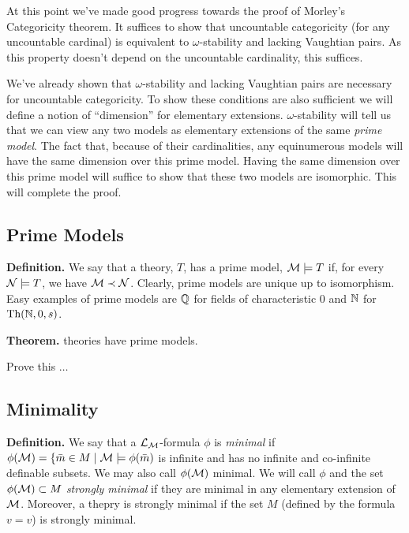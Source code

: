 At this point we've made good progress towards the proof of Morley's Categoricity theorem.
It suffices to show that uncountable categoricity (for any uncountable cardinal) is equivalent to \(\omega\)-stability and lacking Vaughtian pairs.
As this property doesn't depend on the uncountable cardinality, this suffices. 

We've already shown that \(\omega\)-stability and lacking Vaughtian pairs are necessary for uncountable categoricity.
To show these conditions are also sufficient we will define a notion of ``dimension'' for elementary extensions.
\(\omega\)-stability will tell us that we can view any two models as elementary extensions of the same \textit{prime model}.
The fact that, because of their cardinalities, any equinumerous models will have the same dimension over this prime model.
Having the same dimension over this prime model will suffice to show that these two models are isomorphic.
This will complete the proof. 

\subsection{Prime Models}

\textbf{Definition.} We say that a theory, \(T\),  has a prime model, \(\mathcal{M} \models T\) if, for every \(\mathcal{N} \models T\), we have \(\mathcal{M} \prec \mathcal{N}\). 
Clearly, prime models are unique up to isomorphism. Easy examples of prime models are \(\mathbb{Q}\) for fields of characteristic 0 and \(\mathbb{N}\) for \(\text{Th}(\mathbb{N}, 0, s)\). %

\textbf{Theorem.} \omst theories have prime models.
 
{\color{red}Prove this \(\ldots\)}

\subsection{Minimality}

\textbf{Definition.} We say that a \(\mathcal{L}_{\mathcal{M}}\)-formula \(\phi\) is \textit{minimal} if \(\phi(\mathcal{M}) = \{\bar{m} \in M \mid \mathcal{M} \models \phi(\bar{m})\) is infinite and has no infinite and co-infinite definable subsets. 
We may also call \(\phi(\mathcal{M})\) minimal. 
We will call \(\phi\) and the set \(\phi(\mathcal{M}) \subset M\) %
\textit{strongly minimal} if they are minimal in any elementary extension of \(\mathcal{M}\).
Moreover, a thepry is strongly minimal if the set \(M\) (defined by the formula \(v = v\)) is strongly minimal. 

